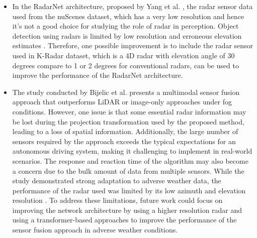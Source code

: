 \documentclass[rnd]{mas_proposal}
\begin{document}
\begin{itemize}
      \item In the RadarNet architecture, proposed by Yang et al. \cite{yang2020radarnet}, the radar sensor data used from the nuScenes dataset, which has a very low resolution and hence it's not a good choice for studying the role of radar in perception. Object detection using radars is limited by low resolution and erroneous elevation estimates \cite{ulrich2021deepreflecs} \cite{drews2022deepfusion}. Therefore, one possible improvement is to include the radar sensor used in K-Radar dataset, which is a 4D radar with elevation angle of 30 degrees compare to 1 or 2 degrees for conventional radars, can be used to improve the performance of the RadarNet architecture.
      \item The study conducted by Bijelic et al. \cite{bijelic2020seeing} presents a multimodal sensor fusion approach that outperforms LiDAR or image-only approaches under fog conditions. However, one issue is that some essential radar information may be lost during the projection transformation used by the proposed method, leading to a loss of spatial information. Additionally, the large number of sensors required by the approach exceeds the typical expectations for an autonomous driving system, making it challenging to implement in real-world scenarios. The response and reaction time of the algorithm may also become a concern due to the bulk amount of data from multiple sensors. While the study demonstrated strong adaptation to adverse weather data, the performance of the radar used was limited by its low azimuth and elevation resolution \cite{Zhang2021Dec}. To address these limitations, future work could focus on improving the network architecture by using a higher resolution radar and using a transformer-based approaches to improve the performance of the sensor fusion approach in adverse weather conditions.


\end{itemize}
\end{document}
